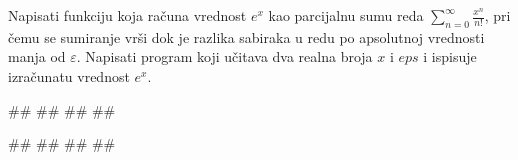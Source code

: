 \begin{Exercise}[label=FUN_21] 
Napisati funkciju  koja
računa vrednost $e^x$ kao parcijalnu sumu reda
$\sum_{n=0}^{\infty}\frac{x^n}{n!}$, pri čemu se sumiranje vrši dok je
razlika sabiraka u redu po apsolutnoj vrednosti manja od
$\varepsilon$. Napisati program koji učitava dva realna broja $x$ i
$eps$ i ispisuje izračunatu vrednost $e^x$.

\begin{miditest}
\begin{upotreba}{1}
#\naslovInt#
##
##
##
\end{upotreba}
\end{miditest}
\begin{miditest}
\begin{upotreba}{2}
#\naslovInt#
##
##
##
\end{upotreba}
\end{miditest}
\end{Exercise}
\ifresenja 
\begin{Answer}[ref=FUN_21]
\end{Answer} 
\fi



